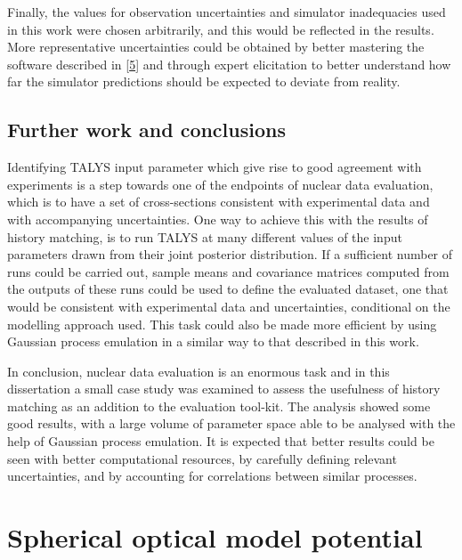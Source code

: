 \documentclass[
  12pt,
  a4paper,
  twoside]{book}
\begin{document}
Finally, the values for observation uncertainties and simulator inadequacies used in this work were chosen arbitrarily, and this would be reflected in the results. More representative uncertainties could be obtained by better mastering the software described in \protect\hyperlink{ref-Schnabel_2021}{{[}5{]}} and through expert elicitation to better understand how far the simulator predictions should be expected to deviate from reality.

\hypertarget{further-work-and-conclusions}{%
\section{Further work and conclusions}\label{further-work-and-conclusions}}

Identifying TALYS input parameter which give rise to good agreement with experiments is a step towards one of the endpoints of nuclear data evaluation, which is to have a set of cross-sections consistent with experimental data and with accompanying uncertainties. One way to achieve this with the results of history matching, is to run TALYS at many different values of the input parameters drawn from their joint posterior distribution. If a sufficient number of runs could be carried out, sample means and covariance matrices computed from the outputs of these runs could be used to define the evaluated dataset, one that would be consistent with experimental data and uncertainties, conditional on the modelling approach used. This task could also be made more efficient by using Gaussian process emulation in a similar way to that described in this work.

In conclusion, nuclear data evaluation is an enormous task and in this dissertation a small case study was examined to assess the usefulness of history matching as an addition to the evaluation tool-kit. The analysis showed some good results, with a large volume of parameter space able to be analysed with the help of Gaussian process emulation. It is expected that better results could be seen with better computational resources, by carefully defining relevant uncertainties, and by accounting for correlations between similar processes.

\hypertarget{appendix-appendices}{%
\appendix}


\hypertarget{OMP-model-appendix}{%
\chapter{Spherical optical model potential}\label{OMP-model-appendix}}
\end{document}
